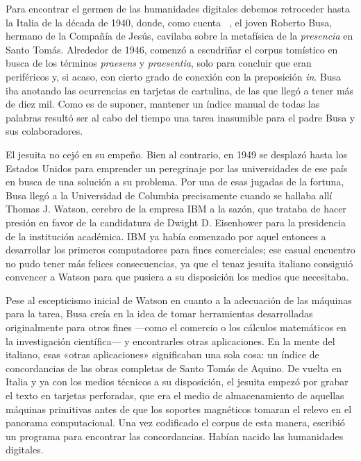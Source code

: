  Para encontrar el germen de las humanidades digitales debemos retroceder hasta la Italia de la década de 1940, donde, como cuenta \citeauthor{winter1999}~\parencite*{winter1999}, el joven Roberto Busa, hermano de la Compañía de Jesús, cavilaba sobre la metafísica de la \textit{presencia} en Santo Tomás. Alrededor de 1946, comenzó a escudriñar el corpus tomístico en busca de los términos \textit{praesens} y \textit{praesentia}, solo para concluir que eran periféricos y, si acaso, con cierto grado de conexión con la preposición \textit{in}. Busa iba anotando las ocurrencias en tarjetas de cartulina, de las que llegó a tener más de diez mil. Como es de suponer, mantener un índice manual de todas las palabras resultó ser al cabo del tiempo una tarea inasumible para el padre Busa y sus colaboradores.

El jesuita no cejó en su empeño. Bien al contrario, en 1949 se desplazó hasta los Estados Unidos para emprender un peregrinaje por las universidades de ese país en busca de una solución a su problema. Por una de esas jugadas de la fortuna, Busa llegó a la Universidad de Columbia precisamente cuando se hallaba allí Thomas J. Watson, cerebro de la empresa IBM a la sazón, que trataba de hacer presión en favor de la candidatura de Dwight D. Eisenhower para la presidencia de la institución académica. IBM ya había comenzado por aquel entonces a desarrollar los primeros computadores para fines comerciales; ese casual encuentro no pudo tener más felices consecuencias, ya que el tenaz jesuita italiano consiguió convencer a Watson para que pusiera a su disposición los medios que necesitaba.

Pese al escepticismo inicial de Watson en cuanto a la adecuación de las máquinas para la tarea, Busa creía en la idea de tomar herramientas desarrolladas originalmente para otros fines —como el comercio o los cálculos matemáticos en la investigación científica— y encontrarles otras aplicaciones. En la mente del italiano, esas «otras aplicaciones» significaban una sola cosa: un índice de concordancias de las obras completas de Santo Tomás de Aquino. De vuelta en Italia y ya con los medios técnicos a su disposición, el jesuita empezó por grabar el texto en tarjetas perforadas, que era el medio de almacenamiento de aquellas máquinas primitivas antes de que los soportes magnéticos tomaran el relevo en el panorama computacional. Una vez codificado el corpus de esta manera, escribió un programa para encontrar las concordancias. Habían nacido las humanidades digitales.

